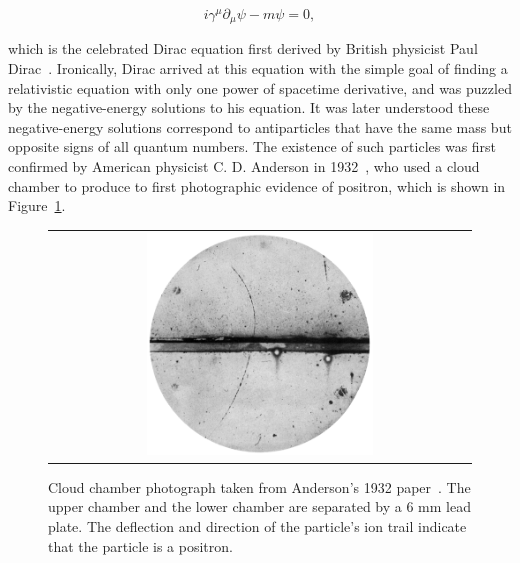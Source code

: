 \begin{equation}
\label{eq:Dirac}
i\gamma^{\mu}\partial_{\mu}\psi-m\psi=0,
\end{equation}

which is the celebrated Dirac equation first derived by British physicist Paul Dirac~\cite{Dirac:1928hu}. Ironically, Dirac arrived at this equation with the simple goal of finding a relativistic equation with only one power of spacetime derivative, and was puzzled by the negative-energy solutions to his equation. It was later understood these negative-energy solutions correspond to antiparticles that have the same mass but opposite signs of all quantum numbers. The existence of such particles was first confirmed by American physicist C. D. Anderson in 1932~\cite{PhysRev.43.491}, who used a cloud chamber to produce to first photographic evidence of positron, which is shown in Figure~\ref{fig:Positron}.

\begin{figure}[tbh!]
 \begin{center}
 \begin{tabular}{c}
 \includegraphics[width=0.55\textwidth]{figures/Part1/Field/Positron}
 \end{tabular}
 \caption{Cloud chamber photograph taken from Anderson's 1932 paper~\cite{PhysRev.43.491}. The upper chamber and the lower chamber are separated by a 6 mm lead plate. The deflection and direction of the particle's ion trail indicate that the particle is a positron.}
 \label{fig:Positron}
 \end{center}
\end{figure}

